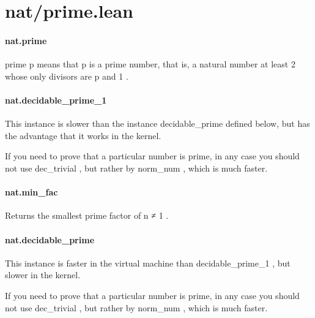 \documentclass{article}
\begin{document}
\section{nat/prime.lean}\paragraph{nat.prime}
\par
\colorbox[RGB]{253,246,227}{{{{\color[RGB]{101, 123, 131} prime p }}}} means that 
\colorbox[RGB]{253,246,227}{{{{\color[RGB]{101, 123, 131} p }}}} is a prime number, that is, a natural number
at least 2 whose only divisors are 
\colorbox[RGB]{253,246,227}{{{{\color[RGB]{101, 123, 131} p }}}} and 
\colorbox[RGB]{253,246,227}{{{{\color[RGB]{108, 113, 196} 1 }}}}.
\paragraph{nat.decidable\_prime\_1}
\par
This instance is slower than the instance 
\colorbox[RGB]{253,246,227}{{{{\color[RGB]{101, 123, 131} decidable\_prime }}}} defined below,
but has the advantage that it works in the kernel.
\par
If you need to prove that a particular number is prime, in any case
you should not use 
\colorbox[RGB]{253,246,227}{{{{\color[RGB]{101, 123, 131} dec\_trivial }}}}, but rather 
\colorbox[RGB]{253,246,227}{{{{\color[RGB]{133, 153, 0} by }}}{{{\color[RGB]{101, 123, 131}  norm\_num }}}}, which is
much faster.
\paragraph{nat.min\_fac}
\par
Returns the smallest prime factor of 
\colorbox[RGB]{253,246,227}{{{{\color[RGB]{101, 123, 131} n  }}}{{{\color[RGB]{181, 137, 0} ≠ }}}{{{\color[RGB]{101, 123, 131}   }}}{{{\color[RGB]{108, 113, 196} 1 }}}}.
\paragraph{nat.decidable\_prime}
\par
This instance is faster in the virtual machine than 
\colorbox[RGB]{253,246,227}{{{{\color[RGB]{101, 123, 131} decidable\_prime\_1 }}}},
but slower in the kernel.
\par
If you need to prove that a particular number is prime, in any case
you should not use 
\colorbox[RGB]{253,246,227}{{{{\color[RGB]{101, 123, 131} dec\_trivial }}}}, but rather 
\colorbox[RGB]{253,246,227}{{{{\color[RGB]{133, 153, 0} by }}}{{{\color[RGB]{101, 123, 131}  norm\_num }}}}, which is
much faster.
\end{document}
